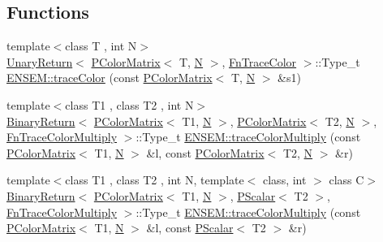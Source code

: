 \subsection*{Functions}
\begin{DoxyCompactItemize}
\item 
{\footnotesize template$<$class T , int N$>$ }\\\mbox{\hyperlink{structENSEM_1_1UnaryReturn}{Unary\+Return}}$<$ \mbox{\hyperlink{classENSEM_1_1PColorMatrix}{P\+Color\+Matrix}}$<$ T, \mbox{\hyperlink{adat__devel_2lib_2hadron_2operator__name__util_8cc_a7722c8ecbb62d99aee7ce68b1752f337}{N}} $>$, \mbox{\hyperlink{structENSEM_1_1FnTraceColor}{Fn\+Trace\+Color}} $>$\+::Type\+\_\+t \mbox{\hyperlink{group__primcolormatrix_ga00fd94578bee0c90e298c41c144c15ee}{E\+N\+S\+E\+M\+::trace\+Color}} (const \mbox{\hyperlink{classENSEM_1_1PColorMatrix}{P\+Color\+Matrix}}$<$ T, \mbox{\hyperlink{adat__devel_2lib_2hadron_2operator__name__util_8cc_a7722c8ecbb62d99aee7ce68b1752f337}{N}} $>$ \&s1)
\item 
{\footnotesize template$<$class T1 , class T2 , int N$>$ }\\\mbox{\hyperlink{structENSEM_1_1BinaryReturn}{Binary\+Return}}$<$ \mbox{\hyperlink{classENSEM_1_1PColorMatrix}{P\+Color\+Matrix}}$<$ T1, \mbox{\hyperlink{adat__devel_2lib_2hadron_2operator__name__util_8cc_a7722c8ecbb62d99aee7ce68b1752f337}{N}} $>$, \mbox{\hyperlink{classENSEM_1_1PColorMatrix}{P\+Color\+Matrix}}$<$ T2, \mbox{\hyperlink{adat__devel_2lib_2hadron_2operator__name__util_8cc_a7722c8ecbb62d99aee7ce68b1752f337}{N}} $>$, \mbox{\hyperlink{structENSEM_1_1FnTraceColorMultiply}{Fn\+Trace\+Color\+Multiply}} $>$\+::Type\+\_\+t \mbox{\hyperlink{group__primcolormatrix_ga690c734a59a0c81041165c0fe948ef2d}{E\+N\+S\+E\+M\+::trace\+Color\+Multiply}} (const \mbox{\hyperlink{classENSEM_1_1PColorMatrix}{P\+Color\+Matrix}}$<$ T1, \mbox{\hyperlink{adat__devel_2lib_2hadron_2operator__name__util_8cc_a7722c8ecbb62d99aee7ce68b1752f337}{N}} $>$ \&l, const \mbox{\hyperlink{classENSEM_1_1PColorMatrix}{P\+Color\+Matrix}}$<$ T2, \mbox{\hyperlink{adat__devel_2lib_2hadron_2operator__name__util_8cc_a7722c8ecbb62d99aee7ce68b1752f337}{N}} $>$ \&r)
\item 
{\footnotesize template$<$class T1 , class T2 , int N, template$<$ class, int $>$ class C$>$ }\\\mbox{\hyperlink{structENSEM_1_1BinaryReturn}{Binary\+Return}}$<$ \mbox{\hyperlink{classENSEM_1_1PColorMatrix}{P\+Color\+Matrix}}$<$ T1, \mbox{\hyperlink{adat__devel_2lib_2hadron_2operator__name__util_8cc_a7722c8ecbb62d99aee7ce68b1752f337}{N}} $>$, \mbox{\hyperlink{classENSEM_1_1PScalar}{P\+Scalar}}$<$ T2 $>$, \mbox{\hyperlink{structENSEM_1_1FnTraceColorMultiply}{Fn\+Trace\+Color\+Multiply}} $>$\+::Type\+\_\+t \mbox{\hyperlink{group__primcolormatrix_gac1ebb50e5da5705b401fc6a361b951c5}{E\+N\+S\+E\+M\+::trace\+Color\+Multiply}} (const \mbox{\hyperlink{classENSEM_1_1PColorMatrix}{P\+Color\+Matrix}}$<$ T1, \mbox{\hyperlink{adat__devel_2lib_2hadron_2operator__name__util_8cc_a7722c8ecbb62d99aee7ce68b1752f337}{N}} $>$ \&l, const \mbox{\hyperlink{classENSEM_1_1PScalar}{P\+Scalar}}$<$ T2 $>$ \&r)

\end{DoxyCompactItemize}
